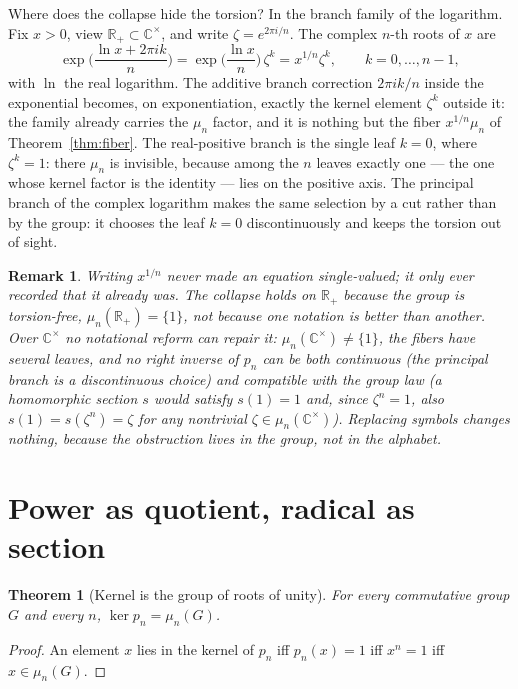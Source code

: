 \documentclass[submission,noinfoline]{jsfds}
\newtheorem{theorem}{Theorem}
\newtheorem*{remark}{Remark}
\newcommand{\Lean}[1]{}
\begin{document}
Where does the collapse hide the torsion? In the branch family of the
logarithm. Fix $x>0$, view $\mathbb R_+\subset\mathbb C^\times$, and
write $\zeta=e^{2\pi i/n}$. The complex $n$-th roots of $x$ are
\[
  \exp\!\Big(\frac{\ln x+2\pi i k}{n}\Big)
  =\exp\!\Big(\frac{\ln x}{n}\Big)\,\zeta^k
  =x^{1/n}\zeta^k,\qquad k=0,\dots,n-1,
\]
with $\ln$ the real logarithm. The additive branch correction
$2\pi i k/n$ inside the exponential becomes, on exponentiation, exactly
the kernel element $\zeta^k$ outside it: the family already carries the
$\mu_n$ factor, and it is nothing but the fiber $x^{1/n}\mu_n$ of
Theorem~\ref{thm:fiber}. The real-positive branch is the single leaf
$k=0$, where $\zeta^k=1$: there $\mu_n$ is invisible, because among the
$n$ leaves exactly one --- the one whose kernel factor is the identity
--- lies on the positive axis. The principal branch of the complex
logarithm makes the same selection by a cut rather than by the group: it
chooses the leaf $k=0$ discontinuously and keeps the torsion out of
sight.

\begin{remark}
Writing $x^{1/n}$ never made an equation single-valued; it only ever
recorded that it already was. The collapse holds on $\mathbb R_+$
because the group is torsion-free, $\mu_n(\mathbb R_+)=\{1\}$, not
because one notation is better than another. Over $\mathbb C^\times$ no
notational reform can repair it: $\mu_n(\mathbb C^\times)\ne\{1\}$, the
fibers have several leaves, and no right inverse of $p_n$ can be both
continuous (the principal branch is a discontinuous choice) and
compatible with the group law (a homomorphic section $s$ would satisfy
$s(1)=1$ and, since $\zeta^n=1$, also $s(1)=s(\zeta^n)=\zeta$ for any
nontrivial $\zeta\in\mu_n(\mathbb C^\times)$). Replacing symbols changes
nothing, because the obstruction lives in the group, not in the
alphabet.
\end{remark}

\section{Power as quotient, radical as section}\label{sec:quotient}

\begin{theorem}[Kernel is the group of roots of unity]\label{thm:ker}
For every commutative group $G$ and every $n$,
$\ker p_n=\mu_n(G)$.
\end{theorem}
\begin{proof}
An element $x$ lies in the kernel of $p_n$ iff $p_n(x)=1$ iff $x^n=1$
iff $x\in\mu_n(G)$. \Lean{powMap\_ker\_eq\_nRoots}
\end{proof}
\end{document}
